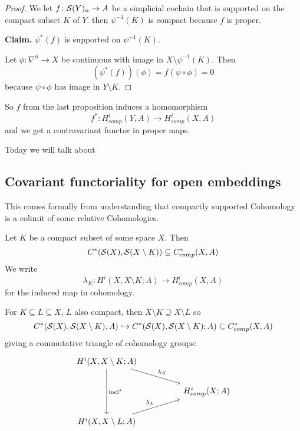\documentclass[language=english]{TemplateLecture}
\begin{document}
\begin{proof}
    We let \(f\colon \mathcal{S}(Y)_n \to A\) be a simplicial cochain that is supported on the compact subset \(K\) of \(Y\). then \(\psi^{-1}(K)\) is compact because \(f\) is proper. 

    \textbf{Claim.} \(\psi^*(f)\) is  supported on \(\psi^{-1}(K)\).

    Let \(\phi\colon \nabla^n \to X\) be continuous with image in \(X \setminus \psi^{-1}(K)\). Then
    \[(\psi^*(f))(\phi) = f(\psi \circ \phi) = 0\]
    because \(\psi \circ \phi\) has image in \(Y \setminus K\).
\end{proof}



So \(f\) from the last proposition induces a homomorphism
\[f^*\colon H^i_{comp}(Y,A) \to H_{comp}^i(X,A)\]
and we get a contravariant functor in proper maps.

Today we will talk about

\subsection{Covariant functoriality for open embeddings}

This comes formally from understanding that compactly supported Cohomology is a colimit of some relative Cohomologies.

Let \(K\) be a compact subset of some space \(X\). Then
\[C^*(\mathcal{S}(X), \mathcal{S}(X\setminus K)) \subseteq C_{comp}^*(X,A)\]
We write
\[\lambda_K\colon H^i(X,X\setminus K; A) \to H_{comp}^i(X,A)\]
for the induced map in cohomology.

For \(K \subseteq L \subseteq X\), \(L\) also compact, then \(X\setminus K \supseteq X \setminus L\) so
\[C^*(\mathcal{S}(X), \mathcal{S}(X \setminus K), A) \hookrightarrow C^*(\mathcal{S}(X), \mathcal{S}(X\setminus K); A) \subseteq C^*_{comp}(X,A)\]
giving a commutative triangle of cohomology groups:
\[\begin{tikzcd}
    {H^i(X, X\setminus K; A)} \ar[rrd, "\lambda_K"] \ar[dd, "\incl^*"] & & \\
    & & {H_{comp}^i(X;A)} \\
    {H^i(X,X\setminus L; A)} \ar[rru, "\lambda_L"] & & \\
\end{tikzcd}\]
\end{document}
